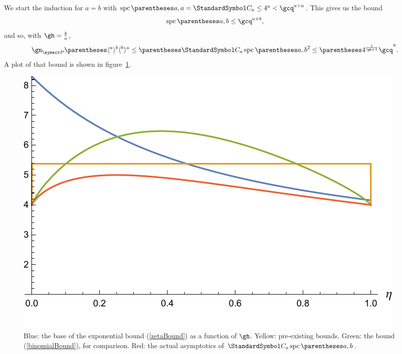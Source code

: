 We start the induction for $a=b$ with $\spc\of{a,a}=\CatalanNumber a \leq 4^{a} < \gcq^{a+a}$.
This gives us the bound\[
\spc\of{a,b}\leq\gcq^{a+b}\text,
\]
and so, with $\gh=\frac{b}{a}$,\begin{equation}
\gn_{\pointset P}\of{\langle^a\rangle^b\langle^b\rangle^a} \leq \pa{\CatalanNumber a \spc\of{a,b}}^2\leq \pa{4^{\frac{1}{\gh+1}} \gcq}^{n}\text.
\label{zetaBound}
\end{equation}
A plot of that bound is shown in figure~\ref{figZetaBound}.

\begin{figure}[htb!]
\centering
\includegraphics[scale=0.75]{spc-zeta-bound.pdf}
\caption{Blue: the base of the exponential bound (\ref{zetaBound}) as a function of $\gh$. Yellow: pre-existing bounds.
Green: the bound (\ref{binomialBound}), for comparison. Red: the actual asymptotics of $\CatalanNumber a \spc\of{a,b}$.\label{figZetaBound}}
\end{figure}